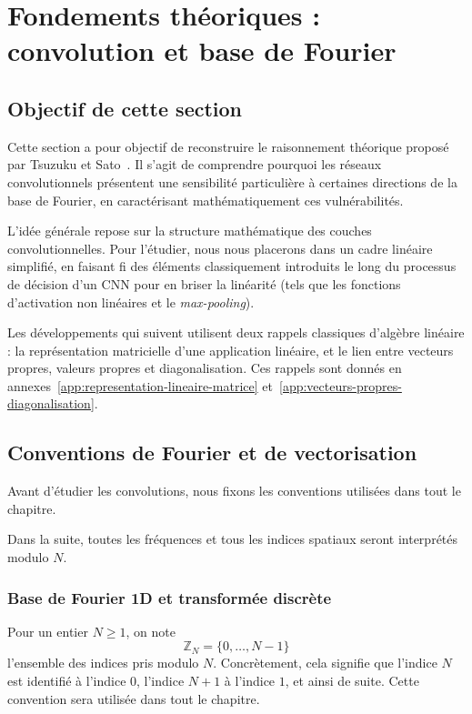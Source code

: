 \chapter{Fondements théoriques : convolution et base de Fourier}

\section{Objectif de cette section}

Cette section a pour objectif de reconstruire le raisonnement théorique proposé par 
Tsuzuku et Sato~\cite{tsuzuku2019structural}. Il s'agit de comprendre pourquoi les réseaux convolutionnels 
présentent une sensibilité particulière à certaines directions de la base de Fourier, en caractérisant mathématiquement 
ces vulnérabilités.

L'idée générale repose sur la structure mathématique des couches convolutionnelles. 
Pour l'étudier, nous nous placerons dans un cadre linéaire simplifié, en faisant fi des éléments 
classiquement introduits le long du processus de décision d'un CNN pour en briser la linéarité 
(tels que les fonctions d'activation non linéaires et le \textit{max-pooling}).

Les développements qui suivent utilisent deux rappels classiques d'algèbre linéaire :
la représentation matricielle d'une application linéaire, et le lien entre vecteurs propres,
valeurs propres et diagonalisation. Ces rappels sont donnés en annexes~\ref{app:representation-lineaire-matrice}
et~\ref{app:vecteurs-propres-diagonalisation}.

\section{Conventions de Fourier et de vectorisation}
\label{sec:conventions-fourier-vectorisation}

Avant d'étudier les convolutions, nous fixons les conventions utilisées dans tout le chapitre.

Dans la suite, toutes les fréquences et tous les indices spatiaux seront interprétés modulo $N$.

\subsection{Base de Fourier 1D et transformée discrète}

Pour un entier $N \geq 1$, on note
\[
    \mathbb{Z}_N = \{0,\dots,N-1\}
\]
l'ensemble des indices pris modulo $N$. Concrètement, cela signifie que l'indice $N$ est identifié
à l'indice $0$, l'indice $N+1$ à l'indice $1$, et ainsi de suite. Cette convention sera utilisée dans
tout le chapitre.

